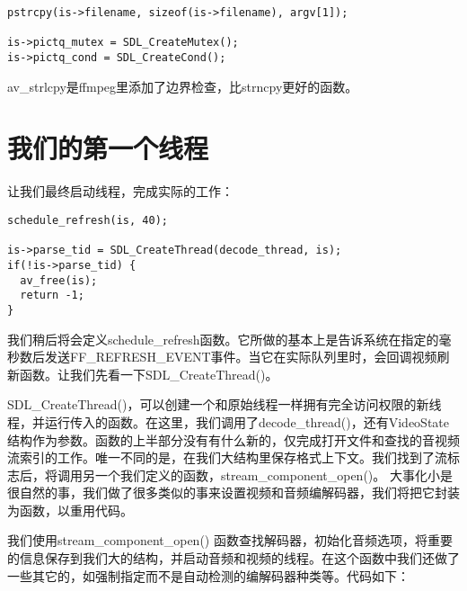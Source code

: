 \begin{lstlisting}
pstrcpy(is->filename, sizeof(is->filename), argv[1]);

is->pictq_mutex = SDL_CreateMutex();
is->pictq_cond = SDL_CreateCond();
\end{lstlisting}

av_strlcpy是ffmpeg里添加了边界检查，比strncpy更好的函数。

\section{我们的第一个线程 }

让我们最终启动线程，完成实际的工作：
\begin{lstlisting}
schedule_refresh(is, 40);

is->parse_tid = SDL_CreateThread(decode_thread, is);
if(!is->parse_tid) {
  av_free(is);
  return -1;
}
\end{lstlisting}

我们稍后将会定义schedule_refresh函数。它所做的基本上是告诉系统在指定的毫秒数后发送FF_REFRESH_EVENT事件。当它在实际队列里时，会回调视频刷新函数。让我们先看一下SDL_CreateThread()。

SDL_CreateThread()，可以创建一个和原始线程一样拥有完全访问权限的新线程，并运行传入的函数。在这里，我们调用了decode_thread()，还有VideoState结构作为参数。函数的上半部分没有有什么新的，仅完成打开文件和查找的音视频流索引的工作。唯一不同的是，在我们大结构里保存格式上下文。我们找到了流标志后，将调用另一个我们定义的函数，stream_component_open()。 大事化小是很自然的事，我们做了很多类似的事来设置视频和音频编解码器，我们将把它封装为函数，以重用代码。

我们使用stream_component_open() 函数查找解码器，初始化音频选项，将重要的信息保存到我们大的结构，并启动音频和视频的线程。在这个函数中我们还做了一些其它的，如强制指定而不是自动检测的编解码器种类等。代码如下：

